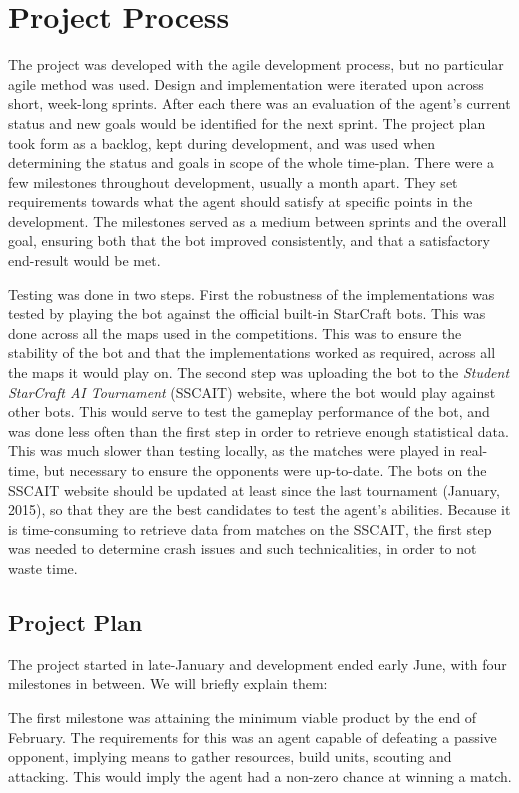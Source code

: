 \chapter{Project Process}
\label{ch:process}
The project was developed with the agile development process, but no particular agile method was used. Design and implementation were iterated upon across short, week-long sprints. After each there was an evaluation of the agent's current status and new goals would be identified for the next sprint. The project plan took form as a backlog, kept during development, and was used when determining the status and goals in scope of the whole time-plan. There were a few milestones throughout development, usually a month apart. They set requirements towards what the agent should satisfy at specific points in the development. The milestones served as a medium between sprints and the overall goal, ensuring both that the bot improved consistently, and that a satisfactory end-result would be met.

Testing was done in two steps. First the robustness of the implementations was tested by playing the bot against the official built-in StarCraft bots. This was done across all the maps used in the competitions. This was to ensure the stability of the bot and that the implementations worked as required, across all the maps it would play on. The second step was uploading the bot to the \emph{Student StarCraft AI Tournament} (SSCAIT) website, where the bot would play against other bots. This would serve to test the gameplay performance of the bot, and was done less often than the first step in order to retrieve enough statistical data. This was much slower than testing locally, as the matches were played in real-time, but necessary to ensure the opponents were up-to-date. The bots on the SSCAIT website should be updated at least since the last tournament (January, 2015), so that they are the best candidates to test the agent's abilities. Because it is time-consuming to retrieve data from matches on the SSCAIT, the first step was needed to determine crash issues and such technicalities, in order to not waste time.

\section{Project Plan}
The project started in late-January and development ended early June, with four milestones in between. We will briefly explain them:

The first milestone was attaining the minimum viable product by the end of February. The requirements for this was an agent capable of defeating a passive opponent, implying means to gather resources, build units, scouting and attacking. This would imply the agent had a non-zero chance at winning a match.

